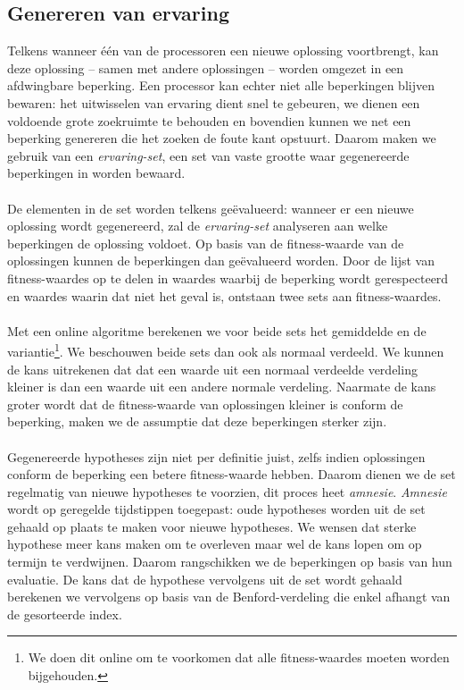 \subsection{Genereren van ervaring}
 
Telkens wanneer \'e\'en van de processoren een nieuwe oplossing voortbrengt, kan deze oplossing -- samen met andere oplossingen -- worden omgezet in een afdwingbare beperking. Een processor kan echter niet alle beperkingen blijven bewaren: het uitwisselen van ervaring dient snel te gebeuren, we dienen een voldoende grote zoekruimte te behouden en bovendien kunnen we net een beperking genereren die het zoeken de foute kant opstuurt. Daarom maken we gebruik van een \emph{ervaring-set}, een set van vaste grootte waar gegenereerde beperkingen in worden bewaard.

\paragraph{}
De elementen in de set worden telkens ge\"evalueerd: wanneer er een nieuwe oplossing wordt gegenereerd, zal de \emph{ervaring-set} analyseren aan welke beperkingen de oplossing voldoet. Op basis van de fitness-waarde van de oplossingen kunnen de beperkingen dan ge\"evalueerd worden. Door de lijst van fitness-waardes op te delen in waardes waarbij de beperking wordt gerespecteerd en waardes waarin dat niet het geval is, ontstaan twee sets aan fitness-waardes.

\paragraph{}
Met een online algoritme\cite[p. 232]{citeulike:175026} berekenen we voor beide sets het gemiddelde en de variantie\footnote{We doen dit online om te voorkomen dat alle fitness-waardes moeten worden bijgehouden.}. We beschouwen beide sets dan ook als normaal verdeeld. We kunnen de kans uitrekenen dat dat een waarde uit een normaal verdeelde verdeling kleiner is dan een waarde uit een andere normale verdeling. Naarmate de kans groter wordt dat de fitness-waarde van oplossingen kleiner is conform de beperking, maken we de assumptie dat deze beperkingen sterker zijn.

\paragraph{}
Gegenereerde hypotheses zijn niet per definitie juist, zelfs indien oplossingen conform de beperking een betere fitness-waarde hebben. Daarom dienen we de set regelmatig van nieuwe hypotheses te voorzien, dit proces heet \emph{amnesie}. \emph{Amnesie} wordt op geregelde tijdstippen toegepast: oude hypotheses worden uit de set gehaald op plaats te maken voor nieuwe hypotheses. We wensen dat sterke hypothese meer kans maken om te overleven maar wel de kans lopen om op termijn te verdwijnen. Daarom rangschikken we de beperkingen op basis van hun evaluatie. De kans dat de hypothese vervolgens uit de set wordt gehaald berekenen we vervolgens op basis van de Benford-verdeling\cite{citeulike:748130} die enkel afhangt van de gesorteerde index.

